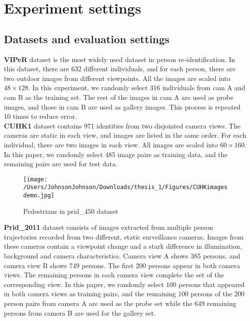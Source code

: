 \chapter{Experiment settings}


\section{Datasets and evaluation settings}

\noindent \textbf{VIPeR} dataset is the most widely used dataset in person re-identification. In this dataset, there are 632 different individuals, and for each person, there are two outdoor images from different viewpoints. All the images are scaled into $48\times128$. In this experiment, we randomly select 316 individuals from cam A and cam B as the training set. The rest of the images in cam A are used as probe images, and those in cam B are used as gallery images. This process is repeated 10 times to reduce error.\\
\textbf{CUHK1} dataset contains 971 identities from two disjointed camera views. The cameras are static in each view, and images are listed in the same order. For each individual, there are two images in each view. All images are scaled into $60\times160$. In this paper, we randomly select 485 image pairs as training data, and the remaining pairs are used for test data. 
\begin{figure}[H]
\begin{raggedleft}
\texttt{[image: /Users/JohnsonJohnson/Downloads/thesis\_1/Figures/CUHKimagesdemo.jpg]}
\vspace{-3em}
\caption{Pedestrians in prid\_450 dataset}
\end{raggedleft}
\end{figure}
\noindent\textbf{Prid\_2011} dataset consists of images extracted from multiple person trajectories recorded from two different, static surveillance cameras. Images from these cameras contain a viewpoint change and a stark difference in illumination, background and camera characteristics. Camera view A shows 385 persons, and camera view B shows 749 persons. The first 200 persons appear in both camera views. The remaining persons in each camera view complete the set of the corresponding view. In this paper, we randomly select 100 persons that appeared in both camera views as training pairs, and the remaining 100 persons of the 200 person pairs from camera A are used as the probe set while the 649 remaining persons from camera B are used for the gallery set.\\
